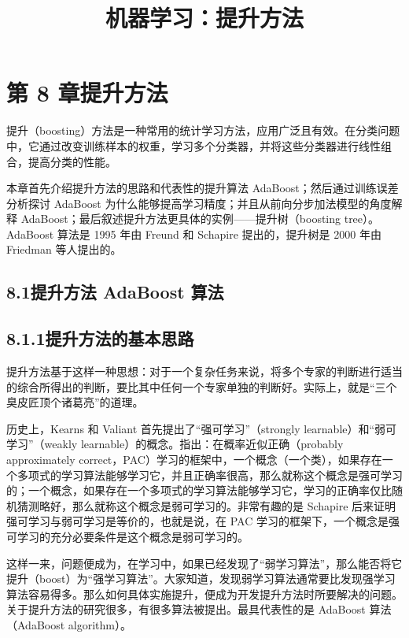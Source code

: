 \documentclass[UTF8, 12pt, fontset=fandol, oneside]{ctexart}
\title{机器学习：提升方法}
\author{}
\date{}
\begin{document}
\maketitle

\section*{第 8 章\quad 提升方法}

提升（boosting）方法是一种常用的统计学习方法，应用广泛且有效。在分类问题中，它通过改变训练样本的权重，学习多个分类器，并将这些分类器进行线性组合，提高分类的性能。

本章首先介绍提升方法的思路和代表性的提升算法 AdaBoost；然后通过训练误差分析探讨 AdaBoost 为什么能够提高学习精度；并且从前向分步加法模型的角度解释 AdaBoost；最后叙述提升方法更具体的实例——提升树（boosting tree）。AdaBoost 算法是 1995 年由 Freund 和 Schapire 提出的，提升树是 2000 年由 Friedman 等人提出的。

\subsection*{8.1\quad 提升方法 AdaBoost 算法}

\subsection*{8.1.1\quad 提升方法的基本思路}

提升方法基于这样一种思想：对于一个复杂任务来说，将多个专家的判断进行适当的综合所得出的判断，要比其中任何一个专家单独的判断好。实际上，就是“三个臭皮匠顶个诸葛亮”的道理。

历史上，Kearns 和 Valiant 首先提出了“强可学习”（strongly learnable）和“弱可学习”（weakly learnable）的概念。指出：在概率近似正确（probably approximately correct，PAC）学习的框架中，一个概念（一个类），如果存在一个多项式的学习算法能够学习它，并且正确率很高，那么就称这个概念是强可学习的；一个概念，如果存在一个多项式的学习算法能够学习它，学习的正确率仅比随机猜测略好，那么就称这个概念是弱可学习的。非常有趣的是 Schapire 后来证明强可学习与弱可学习是等价的，也就是说，在 PAC 学习的框架下，一个概念是强可学习的充分必要条件是这个概念是弱可学习的。

这样一来，问题便成为，在学习中，如果已经发现了“弱学习算法”，那么能否将它提升（boost）为“强学习算法”。大家知道，发现弱学习算法通常要比发现强学习算法容易得多。那么如何具体实施提升，便成为开发提升方法时所要解决的问题。关于提升方法的研究很多，有很多算法被提出。最具代表性的是 AdaBoost 算法（AdaBoost algorithm）。
\end{document}
